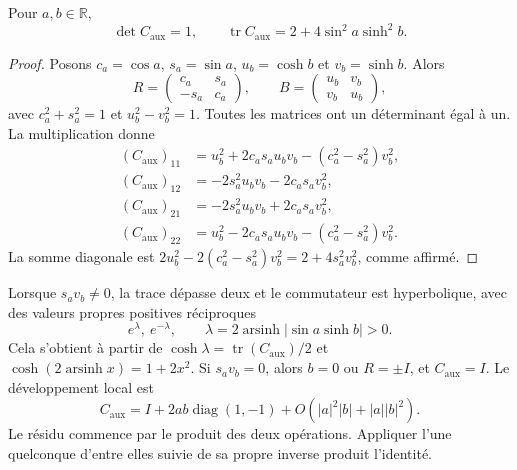 \begin{proposition}
\label{md:aux:prop-traza}
Pour $a,b\in\mathbb R$,
\begin{equation}
 \det C_{\mathrm{aux}}=1,\qquad
 \operatorname{tr}C_{\mathrm{aux}}=2+4\sin^2a\sinh^2b.
 \label{md:aux:traza-compensado}
\end{equation}
\end{proposition}
\begin{proof}
Posons $c_a=\cos a$, $s_a=\sin a$, $u_b=\cosh b$ et $v_b=\sinh b$.
Alors
\[
 R=\begin{pmatrix}c_a&s_a\\-s_a&c_a\end{pmatrix},\qquad
 B=\begin{pmatrix}u_b&v_b\\v_b&u_b\end{pmatrix},
\]
avec $c_a^2+s_a^2=1$ et $u_b^2-v_b^2=1$. Toutes les matrices ont un
déterminant égal à un. La multiplication donne
\begin{equation}
 \begin{aligned}
 (C_{\mathrm{aux}})_{11}&=u_b^2+2c_as_au_bv_b-(c_a^2-s_a^2)v_b^2,\\
 (C_{\mathrm{aux}})_{12}&=-2s_a^2u_bv_b-2c_as_av_b^2,\\
 (C_{\mathrm{aux}})_{21}&=-2s_a^2u_bv_b+2c_as_av_b^2,\\
 (C_{\mathrm{aux}})_{22}&=u_b^2-2c_as_au_bv_b-(c_a^2-s_a^2)v_b^2.
 \end{aligned}
 \label{md:aux:entradas-compensado}
\end{equation}
La somme diagonale est
$2u_b^2-2(c_a^2-s_a^2)v_b^2=2+4s_a^2v_b^2$, comme affirmé.
\end{proof}

Lorsque $s_av_b\ne0$, la trace dépasse deux et le commutateur est
hyperbolique, avec des valeurs propres positives réciproques
\begin{equation}
 e^{\lambda},\ e^{-\lambda},\qquad
 \lambda=2\operatorname{arsinh}|\sin a\sinh b|>0.
 \label{md:aux:espectro-compensado}
\end{equation}
Cela s’obtient à partir de $\cosh\lambda=\operatorname{tr}(C_{\mathrm{aux}})/2$
et $\cosh(2\operatorname{arsinh}x)=1+2x^2$.
Si $s_av_b=0$, alors $b=0$ ou $R=\pm I$, et
$C_{\mathrm{aux}}=I$.
Le développement local est
\begin{equation}
 C_{\mathrm{aux}}=I+2ab\operatorname{diag}(1,-1)
 +O(|a|^2|b|+|a||b|^2).
 \label{md:aux:expansion-compensado}
\end{equation}
Le résidu commence par le produit des deux opérations. Appliquer
l’une quelconque d’entre elles suivie de sa propre inverse produit l’identité.

